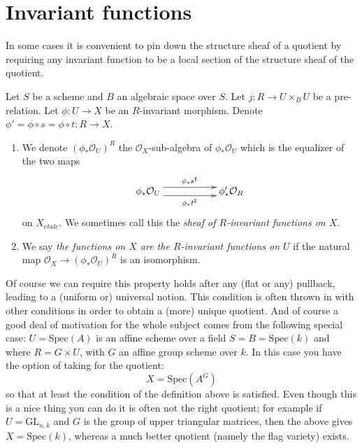 \section{Invariant functions}
\label{section-functions}

\noindent
In some cases it is convenient to pin down the structure sheaf
of a quotient by requiring any invariant function to be a local
section of the structure sheaf of the quotient.

\begin{definition}
\label{definition-functions}
Let $S$ be a scheme and $B$ an algebraic space over $S$.
Let $j : R \to U \times_B U$ be a pre-relation.
Let $\phi : U \to X$ be an $R$-invariant morphism.
Denote $\phi' = \phi \circ s = \phi \circ t : R \to X$.
\begin{enumerate}
\item We denote $(\phi_*\mathcal{O}_U)^R$ the $\mathcal{O}_X$-sub-algebra
of $\phi_*\mathcal{O}_U$ which is the equalizer of the two maps
$$
\xymatrix{
\phi_*\mathcal{O}_U
\ar@<1ex>[rr]^{\phi_*s^\sharp}
\ar@<-1ex>[rr]_{\phi_*t^\sharp}
& &
\phi'_*\mathcal{O}_R
}
$$
on $X_{etale}$. We sometimes call this the
{\it sheaf of $R$-invariant functions on $X$}.
\item We say {\it the functions on $X$ are the $R$-invariant functions on
$U$} if the natural map $\mathcal{O}_X \to (\phi_*\mathcal{O}_U)^R$ 
is an isomorphism.
\end{enumerate}
\end{definition}

\noindent
Of course we can require this property holds after any (flat or any) pullback,
leading to a (uniform or) universal notion. This condition is often thrown in
with other conditions in order to obtain a (more) unique quotient. And of
course a good deal of motivation for the whole subject comes from the following
special case: $U = \text{Spec}(A)$ is an affine scheme over a field
$S = B = \text{Spec}(k)$ and where $R = G \times U$, with
$G$ an affine group scheme over $k$. In this case
you have the option of taking for the quotient:
$$
X = \text{Spec}(A^G)
$$
so that at least the condition of the definition above is satisfied.
Even though this is a nice thing you can do it is often not the right
quotient; for example if $U = \text{GL}_{n, k}$ and $G$ is the group of
upper triangular matrices, then the above gives $X = \text{Spec}(k)$, whereas
a much better quotient (namely the flag variety) exists.








